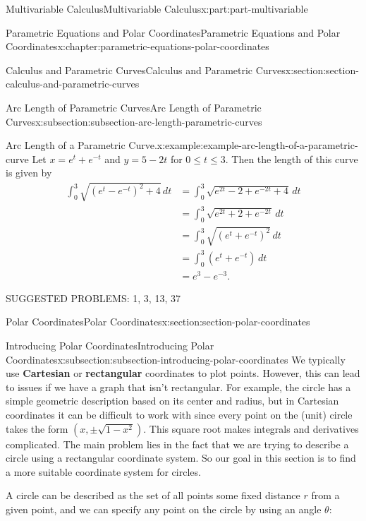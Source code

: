\documentclass[twoside,10pt,]{book}
\newcommand{\terminology}[1]{\textbf{#1}}
\numberwithin{equation}{part}
\newcommand{\amp}{&}
\begin{document}
\begin{partptx}{Multivariable Calculus}{}{Multivariable Calculus}{}{}{x:part:part-multivariable}
\begin{chapterptx}{Parametric Equations and Polar Coordinates}{}{Parametric Equations and Polar Coordinates}{}{}{x:chapter:parametric-equations-polar-coordinates}
\begin{sectionptx}{Calculus and Parametric Curves}{}{Calculus and Parametric Curves}{}{}{x:section:section-calculus-and-parametric-curves}
\begin{subsectionptx}{Arc Length of Parametric Curves}{}{Arc Length of Parametric Curves}{}{}{x:subsection:subsection-arc-length-parametric-curves}
\begin{equation*}
\end{equation*}
\begin{example}{Arc Length of a Parametric Curve.}{x:example:example-arc-length-of-a-parametric-curve}%
Let \(x = e^{t}+e^{-t}\) and \(y = 5-2t\) for \(0\leq t\leq 3.\) Then the length of this curve is given by%
%
\begin{align*}
\int_{0}^{3}\sqrt{(e^{t}-e^{-t})^{2} + 4}\,dt \amp = \int_{0}^{3}\sqrt{e^{2t}-2 + e^{-2t} + 4}\,dt \\
\amp = \int_{0}^{3}\sqrt{e^{2t} + 2 + e^{-2t}}\,dt \\
\amp = \int_{0}^{3}\sqrt{(e^{t}+e^{-t})^{2}}\,dt \\
\amp = \int_{0}^{3}(e^{t}+e^{-t})\,dt\\
\amp = e^{3}-e^{-3}.
\end{align*}
\end{example}
SUGGESTED PROBLEMS: 1, 3, 13, 37%
\end{subsectionptx}
\end{sectionptx}
%
%
\typeout{************************************************}
\typeout{************************************************}
%
\begin{sectionptx}{Polar Coordinates}{}{Polar Coordinates}{}{}{x:section:section-polar-coordinates}
%
%
\typeout{************************************************}
\typeout{************************************************}
%
\begin{subsectionptx}{Introducing Polar Coordinates}{}{Introducing Polar Coordinates}{}{}{x:subsection:subsection-introducing-polar-coordinates}
We typically use \terminology{Cartesian} or \terminology{rectangular} coordinates to plot points. However, this can lead to issues if we have a graph that isn't rectangular. For example, the circle has a simple geometric description based on its center and radius, but in Cartesian coordinates it can be difficult to work with since every point on the (unit) circle takes the form \((x,\pm\sqrt{1-x^{2}})\). This square root makes integrals and derivatives complicated. The main problem lies in the fact that we are trying to describe a circle using a rectangular coordinate system. So our goal in this section is to find a more suitable coordinate system for circles.%
\par
A circle can be described as the set of all points some fixed distance \(r\) from a given point, and we can specify any point on the circle by using an angle \(\theta\):%

\end{subsectionptx}
\end{sectionptx}
\end{chapterptx}
\end{partptx}
\end{document}
